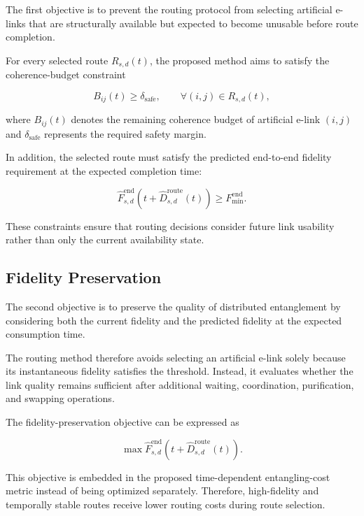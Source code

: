 The first objective is to prevent the routing protocol from selecting artificial e-links that are structurally available but expected to become unusable before route completion.

For every selected route $R_{s,d}(t)$, the proposed method aims to satisfy the coherence-budget constraint

\begin{equation}
    B_{ij}(t)
    \geq
    \delta_{\mathrm{safe}},
    \qquad
    \forall (i,j)
    \in
    R_{s,d}(t),
\end{equation}

where $B_{ij}(t)$ denotes the remaining coherence budget of artificial e-link $(i,j)$ and $\delta_{\mathrm{safe}}$ represents the required safety margin.

In addition, the selected route must satisfy the predicted end-to-end fidelity requirement at the expected completion time:

\begin{equation}
    \widehat{F}_{s,d}^{\mathrm{end}}
    \left(
    t+
    \widehat{D}_{s,d}^{\mathrm{route}}(t)
    \right)
    \geq
    F_{\min}^{\mathrm{end}}.
\end{equation}

These constraints ensure that routing decisions consider future link usability rather than only the current availability state.

\subsection{Fidelity Preservation}

The second objective is to preserve the quality of distributed entanglement by considering both the current fidelity and the predicted fidelity at the expected consumption time.

The routing method therefore avoids selecting an artificial e-link solely because its instantaneous fidelity satisfies the threshold. Instead, it evaluates whether the link quality remains sufficient after additional waiting, coordination, purification, and swapping operations.

The fidelity-preservation objective can be expressed as

\begin{equation}
    \max
    \widehat{F}_{s,d}^{\mathrm{end}}
    \left(
    t+
    \widehat{D}_{s,d}^{\mathrm{route}}(t)
    \right).
\end{equation}

This objective is embedded in the proposed time-dependent entangling-cost metric instead of being optimized separately. Therefore, high-fidelity and temporally stable routes receive lower routing costs during route selection.

